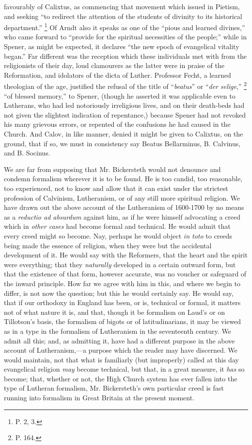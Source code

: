 favourably of Calixtus, as commencing that movement which issued in
Pietism, and seeking ``to redirect the attention of the students of
divinity to its historical department.'' \footnote{P. 2, 3.} Of Arndt also it speaks as one of the ``pious and learned
divines,'' who came forward to ``provide for the spiritual necessities of
the people;'' while in Spener, as might be expected, it declares ``the new
epoch of evangelical vitality began.'' Far different was the reception
which these individuals met with from the religionists of their day,
loud clamourers as the latter were in praise of the Reformation, and
idolators of the dicta of Luther. Professor Fecht, a learned theologian
of the age, justified the refusal of the title of ``\emph{beatus}'' or ``\emph{der
selige},'' \footnote{P. 164.} ``of blessed
memory,'' to Spener, (though he asserted it was applicable even to
Lutherans, who had led notoriously irreligious lives, and on their
death-beds had not given the slightest indication of repentance,)
because Spener had not revoked his many grievous errors, or repented of
the confusions he had caused in the Church. And Calov, in like manner,
denied it might be given to Calixtus, on the ground, that if so, we must
in consistency say Beatus Bellarminus, B. Calvinus, and B. Socinus.

We are far from supposing that Mr. Bickersteth
would not denounce and condemn formalism wherever it is to be found. He
is too candid, too reasonable, too experienced, not to know and allow
that it can exist under the strictest profession of Calvinism,
Lutheranism, or of any still more spiritual religion. We have drawn out
the above account of the Lutheranism of 1600-1700 by no means as a \emph{reductio
ad absurdum} against him, as if he were himself advocating a
creed which in \emph{other cases} had become formal and technical. He
would admit that every creed might so become. Nay, perhaps he would
object \emph{in toto} to creeds being made the essence of religion, when
they were but the accidental development of it. He would say with the
Reformers, that the heart and the spirit were everything; that they \emph{naturally}
developed in a certain outward form, but that the existence of that
form, however accurate, was no voucher or safeguard of the inward
principle. How far we agree with him in this, and where we begin to
differ, is not now the question; but this he would certainly say. He
would say, that if our orthodoxy in England has been, or is, technical
or formal, it matters not of what nature it is, and that, though it be
formalism on Laud's or on Tillotson's basis, the formalism of bigots or
of latitudinarians, it may be viewed as in a type in the formalism of
Lutheranism in the seventeenth century. We admit all this; and, as
admitting it, have had a different purpose in the above account of
Lutheranism,—a purpose which the reader may have discerned. We would
maintain, not that what is familiarly (but improperly) called at this
day evangelical religion \emph{may} become technical, but that, in a
great measure, it \emph{has} so become; that, whether or not, the High
Church system has ever fallen into the type of Lutheran formalism, Mr.
Bickersteth's own particular creed is fast running into formalism in
Great Britain at the present moment.

